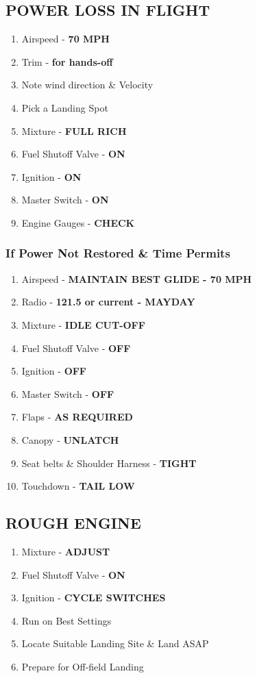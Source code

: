 \documentclass[14pt,letterpaper, twoside]{extarticle}
\begin{document}
	
\subsection{POWER LOSS IN FLIGHT}

\begin{enumerate}
\item Airspeed - \textbf{70 MPH}
\item Trim - \textbf{for hands-off}
\item Note wind direction \& Velocity
\item Pick a Landing Spot
\item Mixture - \textbf{FULL RICH}
\item Fuel Shutoff Valve - \textbf{ON}
\item Ignition - \textbf{ON}
\item Master Switch  - \textbf{ON}
\item Engine Gauges - \textbf{CHECK}
\end{enumerate}

\subsubsection{If Power Not Restored \& Time Permits}

\begin{enumerate}
\item Airspeed - \textbf{MAINTAIN BEST GLIDE - 70 MPH}
\item Radio - \textbf{121.5 or current - MAYDAY}
\item Mixture - \textbf{IDLE CUT-OFF}
\item Fuel Shutoff Valve - \textbf{OFF}
\item Ignition - \textbf{OFF}
\item Master Switch - \textbf{OFF}
\item Flaps - \textbf{AS REQUIRED}
\item Canopy - \textbf{UNLATCH}
\item Seat belts \& Shoulder Harness - \textbf{TIGHT}
\item Touchdown - \textbf{TAIL LOW}
\end{enumerate}
	
\subsection{ROUGH ENGINE}

\begin{enumerate}
\item Mixture - \textbf{ADJUST}
\item Fuel Shutoff Valve - \textbf{ON}
\item Ignition - \textbf{CYCLE SWITCHES}
\item Run on Best Settings
\item Locate Suitable Landing Site \& Land ASAP
\item Prepare for Off-field Landing
\end{enumerate}
\end{document}
